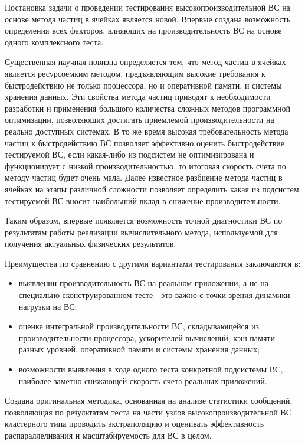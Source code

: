 {\novelty}
Постановка задачи о проведении тестирования высокопроизводительной ВС на основе метода частиц в ячейках является новой. Впервые создана возможность определения всех факторов, влияющих на производительность ВС на основе одного комплексного теста. 

Существенная научная новизна определяется тем, что метод частиц в ячейках является ресурсоемким методом, предъявляющим высокие требования к быстродействию не только процессора, но и оперативной памяти, и системы хранения данных. Эти свойства метода частиц приводят к необходимости разработки и применения большого количества сложных методов программной оптимизации, позволяющих достигать приемлемой производительности на реально доступных системах. В то же время высокая требовательность метода частиц к быстродействию ВС позволяет эффективно оценить быстродействие тестируемой ВС, если какая-либо из подсистем не оптимизирована и функционирует с низкой производительностью, то итоговая скорость счета по методу частиц будет очень мала.
Далее известное разбиение метода частиц в ячейках на этапы различной сложности позволяет определить какая из подсистем тестируемой ВС вносит наибольший вклад в снижение производительности. 

Таким образом, впервые появляется возможность точной диагностики ВС по результатам работы реализации вычислительного метода, используемой для получения актуальных физических результатов.   

Преимущества по сравнению с другими вариантами тестирования заключаются в:
\begin{itemize}
	\item выявлении производительность ВС на реальном приложении, а не на специально сконструированном тесте - это важно с точки зрения динамики нагрузки на ВС; 
	
	\item оценке интегральной производительности ВС, складывающейся из производительности процессора, ускорителей вычислений, кэш-памяти разных уровней, оперативной памяти и системы хранения данных;
	\item возможности выявления в ходе одного теста конкретной подсистемы ВС, наиболее заметно снижающей скорость счета реальных приложений. 
	
\end{itemize}
Создана оригинальная методика, основанная на анализе статистики сообщений, позволяющая по результатам теста на части узлов высокопроизводительной ВС кластерного типа проводить экстраполяцию и оценивать эффективность распараллеливания и масштабируемость для ВС в целом.

